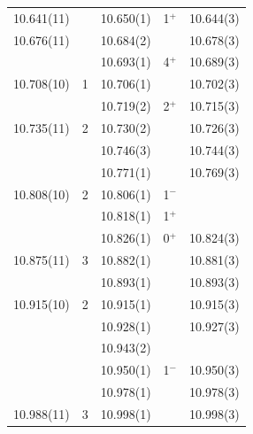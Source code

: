 \begin{center}
\begin{longtable}{cc cc c}
     10.641(11)        &          & 10.650(1)   &            1$^+$              &    10.644(3)  \\
     10.676(11)        &          & 10.684(2)   &                               &    10.678(3)  \\
                       &          & 10.693(1)   &            4$^+$              &    10.689(3)  \\
     10.708(10)        & 1        & 10.706(1)   &                               &    10.702(3)  \\
                       &          & 10.719(2)   &            2$^+$              &    10.715(3)  \\
     10.735(11)        & 2        & 10.730(2)   &                               &    10.726(3)  \\
                       &          & 10.746(3)   &                               &    10.744(3)  \\
                       &          & 10.771(1)   &                               &    10.769(3)  \\
     10.808(10)        & 2        & 10.806(1)   &            1$^-$              &               \\
                       &          & 10.818(1)   &            1$^+$              &               \\
                       &          & 10.826(1)   &            0$^+$              &    10.824(3)  \\
     10.875(11)        & 3        & 10.882(1)   &                               &    10.881(3)  \\
                       &          & 10.893(1)   &                               &    10.893(3)  \\
     10.915(10)        & 2        & 10.915(1)   &                               &    10.915(3)  \\
                       &          & 10.928(1)   &                               &    10.927(3)  \\
                       &          & 10.943(2)   &                               &               \\
                       &          & 10.950(1)   &            1$^-$              &    10.950(3)  \\
                       &          & 10.978(1)   &                               &    10.978(3)  \\
   10.988(11)          & 3        & 10.998(1)   &                               &    10.998(3)  \\

\end{longtable}
\end{center}
